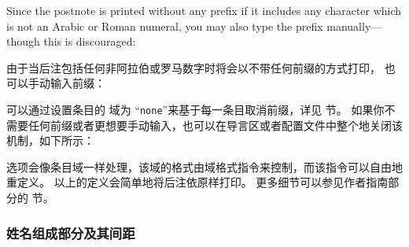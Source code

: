 \begin{ltxexample}
\cite[27\psq]{key}
\cite[55\psqq]{key}
\end{ltxexample}
%
Since the postnote is printed without any prefix if it includes any character which is not an Arabic or Roman numeral, you may also type the prefix manually---though this is discouraged:


由于当后注包括任何非阿拉伯或罗马数字时将会以不带任何前缀的方式打印，
也可以手动输入前缀：

\begin{ltxexample}
\cite[p.~5]{key}
\end{ltxexample}
%
可以通过设置条目的  域为 “\texttt{none}”来基于每一条目取消前缀，详见  节。
如果你不需要任何前缀或者更想要手动输入，也可以在导言区或者配置文件中整个地关闭该机制，如下所示：

\begin{ltxexample}
\end{ltxexample}
%
 选项会像条目域一样处理，该域的格式由域格式指令来控制，而该指令可以自由地重定义。
以上的定义会简单地将后注依原样打印。
更多细节可以参见作者指南部分的  节。

\subsubsection{姓名组成部分及其间距}
\label{use:cav:nam}


